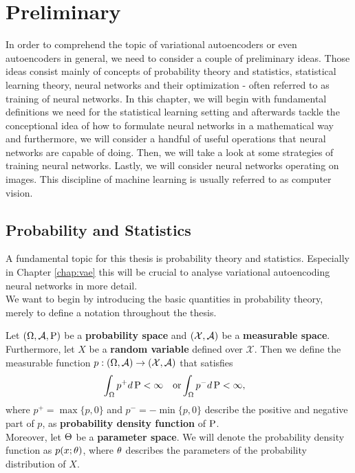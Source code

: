 \chapter{Preliminary}\label{chap:preliminary}
In order to comprehend the topic of variational autoencoders or even autoencoders in general, we need to consider a couple of preliminary ideas. Those ideas consist mainly of concepts of probability theory and statistics, statistical learning theory, neural networks and their optimization - often referred to as training of neural networks. In this chapter, we will begin with fundamental definitions we need for the statistical learning setting and afterwards tackle the conceptional idea of how to formulate neural networks in a mathematical way and furthermore, we will consider a handful of useful operations that neural networks are capable of doing. Then, we will take a look at some strategies of training neural networks. Lastly, we will consider neural networks operating on images. This discipline of machine learning is usually referred to as computer vision.


\section{Probability and Statistics}

A fundamental topic for this thesis is probability theory and statistics. Especially in Chapter \ref{chap:vae} this will be crucial to analyse variational autoencoding neural networks in more detail.\\
We want to begin by introducing the basic quantities in probability theory, merely to define a notation throughout the thesis.


\begin{definition}\label{def:pdf}
Let $(\Omega, \operatorname{\mathcal{A}}, \operatorname{\text{P}})$ be a \textbf{probability space} and $(\mathcal{X}, \operatorname{\mathcal{A}})$ be a \textbf{measurable space}. Furthermore, let $X$ be a \textbf{random variable} defined over $\mathcal{X}$. Then we define the measurable function $p:(\Omega,\operatorname{\mathcal{A}}) \to (\mathcal{X}, \operatorname{\mathcal{A}})$ that satisfies
\begin{align*}
&\int_{\Omega} p^+ d\operatorname{\text{P}}< \infty &\text{or} &\int_{\Omega} p^- d\operatorname{\text{P}} < \infty,
\end{align*}
where $p^+ = \max \{p, 0\}$ and $p^- = - \min\{p, 0\}$ describe the positive and negative part of $p$, as \textbf{probability density function} of $\operatorname{\text{P}}$.\\
Moreover, let $\operatorname{\Theta}$ be a \textbf{parameter space}. We will denote the probability density function as $p(x; \theta)$, where $\theta$ describes the parameters of the probability distribution of $X$.
\end{definition}

